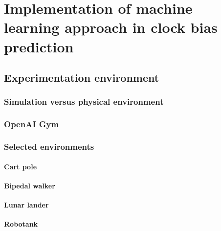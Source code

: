 \FloatBarrier
\chapter{Implementation of machine learning approach in clock bias prediction}


\FloatBarrier
\section{Experimentation environment}

\FloatBarrier
\subsection{Simulation versus physical environment}

\FloatBarrier
\subsection{OpenAI Gym}

\FloatBarrier
\subsection{Selected environments}

\FloatBarrier
\subsubsection{Cart pole}
\FloatBarrier
\subsubsection{Bipedal walker}
\FloatBarrier
\subsubsection{Lunar lander}
\FloatBarrier
\subsubsection{Robotank}
